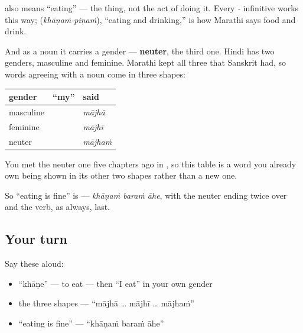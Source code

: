 \begin{grammarlens}[title={Grammar Lens: the infinitive is a neuter noun}]
\textbf{} also means \textquotedblleft{}eating\textquotedblright{} — the thing, not the act of doing it. Every \emph{-} infinitive works this way; \emph{} (\emph{khāṇaṁ-piṇaṁ}), \textquotedblleft{}eating and drinking,\textquotedblright{} is how Marathi says food and drink.

And as a noun it carries a gender — \textbf{neuter}, the third one. Hindi has two genders, masculine and feminine. Marathi kept all three that Sanskrit had, so words agreeing with a noun come in three shapes:

\noindent
\begin{tabularx}{\linewidth}{@{}>{\raggedright\arraybackslash}X>{\raggedright\arraybackslash}X>{\raggedright\arraybackslash}X@{}}
\toprule
\textbf{gender} & \textbf{\textquotedblleft{}my\textquotedblright{}} & \textbf{said} \\
\midrule
masculine & \mr{माझा} & \emph{mājhā} \\
feminine & \mr{माझी} & \emph{mājhī} \\
neuter & \mr{माझं} & \emph{mājhaṁ} \\
\bottomrule
\end{tabularx}

You met the neuter one five chapters ago in \textbf{ }, so this table is a word you already own being shown in its other two shapes rather than a new one.

So \textquotedblleft{}eating is fine\textquotedblright{} is \textbf{  } — \emph{khāṇaṁ baraṁ āhe}, with the neuter ending twice over and the verb, as always, last.
\end{grammarlens}

\subsection*{Your turn}
Say these aloud:

\begin{itemize}
\raggedright
  \item \textquotedblleft{}khāṇe\textquotedblright{} — to eat — then \textquotedblleft{}I eat\textquotedblright{} in your own gender
  \item the three shapes — \textquotedblleft{}mājhā … mājhī … mājhaṁ\textquotedblright{}
  \item \textquotedblleft{}eating is fine\textquotedblright{} — \textquotedblleft{}khāṇaṁ baraṁ āhe\textquotedblright{}
\end{itemize}

